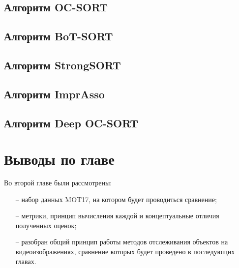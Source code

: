 \subsection{Алгоритм OC-SORT}


\subsection{Алгоритм BoT-SORT}


\subsection{Алгоритм StrongSORT}


\subsection{Алгоритм ImprAsso}


\subsection{Алгоритм Deep OC-SORT}


\section{Выводы по главе}
Во второй главе были рассмотрены:
\begin{itemize}
  \item[--] набор данных MOT17, на котором будет проводиться сравнение;
  \item[--] метрики, принцип вычисления каждой и концептуальные отличия полученных оценок;
  \item[--] разобран общий принцип работы методов отслеживания объектов на видеоизображениях, сравнение которых будет проведено в последующих главах.  
\end{itemize}